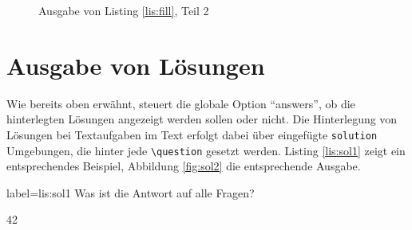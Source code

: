 \begin{figure}
\caption{Ausgabe von Listing \ref{lis:fill}, Teil 2}\label{fig:fill2}
\end{figure}

\section{Ausgabe von Lösungen}

Wie bereits oben erwähnt, steuert die globale Option \enquote{answers}, ob die hinterlegten Lösungen angezeigt werden sollen oder nicht. 
Die Hinterlegung von Lösungen bei Textaufgaben im Text erfolgt dabei über eingefügte \texttt{solution} Umgebungen, die hinter jede \texttt{\textbackslash question} gesetzt werden.
Listing \ref{lis:sol1} zeigt ein entsprechendes Beispiel, Abbildung \ref{fig:sol2} die entsprechende Ausgabe.

\begin{lfgwcode}{label={lis:sol1}}
\question Was ist die Antwort auf alle Fragen?

\begin{solution}
42
\end{solution}
\end{lfgwcode}

